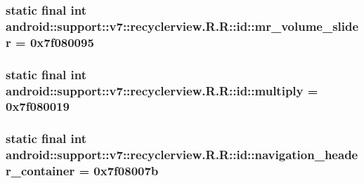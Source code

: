 \hypertarget{classandroid_1_1support_1_1v7_1_1recyclerview_1_1_r_1_1id_a928ffc632745d4dc184f2b583f4bc2f}{
\subsubsection[{mr\_\-volume\_\-slider}]{\setlength{\rightskip}{0pt plus 5cm}static final int android::support::v7::recyclerview.R.R::id::mr\_\-volume\_\-slider = 0x7f080095}}
\label{classandroid_1_1support_1_1v7_1_1recyclerview_1_1_r_1_1id_a928ffc632745d4dc184f2b583f4bc2f}


\hypertarget{classandroid_1_1support_1_1v7_1_1recyclerview_1_1_r_1_1id_fd873e2ea0016e44a83357e89123776a}{
\subsubsection[{multiply}]{\setlength{\rightskip}{0pt plus 5cm}static final int android::support::v7::recyclerview.R.R::id::multiply = 0x7f080019}}
\label{classandroid_1_1support_1_1v7_1_1recyclerview_1_1_r_1_1id_fd873e2ea0016e44a83357e89123776a}


\hypertarget{classandroid_1_1support_1_1v7_1_1recyclerview_1_1_r_1_1id_bf65b002203cfede3b5777ac9f5f61aa}{
\subsubsection[{navigation\_\-header\_\-container}]{\setlength{\rightskip}{0pt plus 5cm}static final int android::support::v7::recyclerview.R.R::id::navigation\_\-header\_\-container = 0x7f08007b}}
\label{classandroid_1_1support_1_1v7_1_1recyclerview_1_1_r_1_1id_bf65b002203cfede3b5777ac9f5f61aa}


